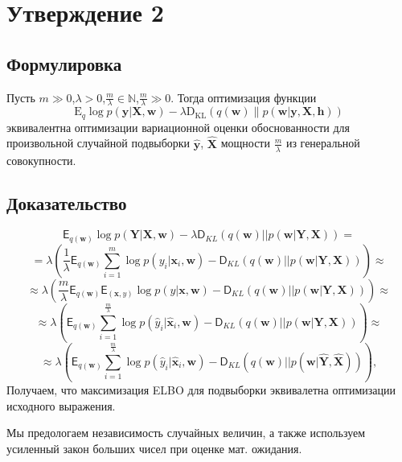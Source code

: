 \documentclass[a4paper,14pt]{extarticle}
\numberwithin{equation}{section}
\begin{document}
	\section*{Утверждение 2}
	\subsection*{Формулировка}
	Пусть $m\gg0$,$\lambda>0$,$\frac{m}{\lambda} \in \mathbb{N}$,$\frac{m}{\lambda}\gg0$. Тогда оптимизация функции
	$$\mathrm{E}_{q} \log p(\mathbf{y} | \mathbf{X}, \mathbf{w})-\lambda \mathrm{D}_{\mathrm{KL}}(q(\mathbf{w}) \| p(\mathbf{w} | \mathbf{y}, \mathbf{X}, \mathbf{h}))$$
	эквивалентна оптимизации вариационной оценки обоснованности для произвольной случайной подвыборки $\hat{\mathbf{y}}$, $\hat{\mathbf{X}}$ мощности $\frac{m}{\lambda} $ из генеральной
	совокупности.
	
	\subsection*{Доказательство}


$$
\mathsf{E}_{q(\mathbf{w})} \log{p\left(\mathbf{Y}|\mathbf{X},\mathbf{w}\right)} - \lambda\mathsf{D}_{KL}\left(q\left(\mathbf{w}\right)||p\left(\mathbf{w}|\mathbf{Y},\mathbf{X}\right)\right) =$$ 
$$=\lambda\left(\frac{1}{\lambda}\mathsf{E}_{q(\mathbf{w})}\sum_{i=1}^{m}\log{p\left(y_i|\mathbf{x}_{i}, \mathbf{w}\right)} - \mathsf{D}_{KL}\left(q\left(\mathbf{w}\right)||p\left(\mathbf{w}|\mathbf{Y},\mathbf{X}\right)\right)\right) \approx  $$
$$\approx\lambda\left(\frac{m}{\lambda}\mathsf{E}_{q(\mathbf{w})}\mathsf{E}_{\left(\mathbf{x}, y\right)}\log{p\left(y|\mathbf{x}, \mathbf{w}\right)}- \mathsf{D}_{KL}\left(q\left(\mathbf{w}\right)||p\left(\mathbf{w}|\mathbf{Y},\mathbf{X}\right)\right)\right) \approx  $$
$$\approx\lambda\left(\mathsf{E}_{q(\mathbf{w})}\sum_{i=1}^{\frac{m}{\lambda}}\log{p\left(\hat{y}_i|\hat{\mathbf{x}}_{i}, \mathbf{w}\right)} - \mathsf{D}_{KL}\left(q\left(\mathbf{w}\right)||p\left(\mathbf{w}|\mathbf{Y},\mathbf{X}\right)\right)\right) \approx $$
$$\approx\lambda\left(\mathsf{E}_{q(\mathbf{w})}\sum_{i=1}^{\frac{m}{\lambda}}\log{p\left(\hat{y}_i|\hat{\mathbf{x}}_{i}, \mathbf{w}\right)} - \mathsf{D}_{KL}\left(q\left(\mathbf{w}\right)||p\left(\mathbf{w}|\hat{\mathbf{Y}},\hat{\mathbf{X}}\right)\right)\right),
$$
Получаем, что максимизация ELBO для подвыборки эквивалетна оптимизации исходного выражения. 

Мы предологаем независимость случайных величин, а также используем усиленный закон больших чисел при оценке мат. ожидания.
\end{document}

